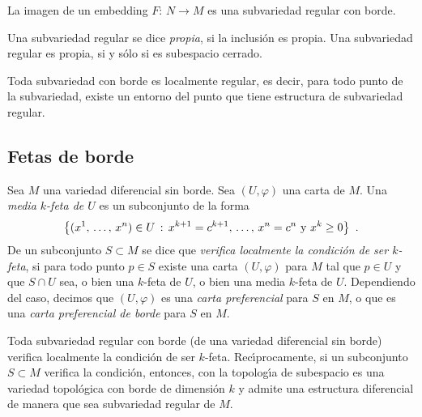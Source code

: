 La imagen de un embedding $F:\,N\rightarrow M$ es una subvariedad regular
con borde.

Una subvariedad regular se dice \emph{propia}, si la inclusi\'{o}n es propia.
Una subvariedad regular es propia, si y s\'{o}lo si es subespacio cerrado.

Toda subvariedad con borde es localmente regular, es decir, para todo
punto de la subvariedad, existe un entorno del punto que tiene estructura
de subvariedad regular.

\subsection{Fetas de borde}
Sea $M$ una variedad diferencial sin borde. Sea $(U,\varphi)$ una carta
de $M$. Una \emph{media $k$-feta de $U$} es un subconjunto de la forma
\begin{align*}
	\left\lbrace (\lista*{x}{n})\in U\,:\,
		x^{k+1}=c^{k+1},\,\dots,\,x^{n}=c^{n}\text{ y }
		x^{k}\geq 0\right\rbrace
	\text{ .}
\end{align*}
%
De un subconjunto $S\subset M$ se dice que \emph{verifica localmente la %
condici\'{o}n de ser $k$-feta}, si para todo punto $p\in S$ existe una
carta $(U,\varphi)$ para $M$ tal que $p\in U$ y que $S\cap U$ sea, o bien
una $k$-feta de $U$, o bien una media $k$-feta de $U$. Dependiendo del caso,
decimos que $(U,\varphi)$ es una \emph{carta preferencial} para $S$ en $M$,
o que es una \emph{carta preferencial de borde} para $S$ en $M$.

Toda subvariedad regular con borde (de una variedad diferencial sin borde)
verifica localmente la condici\'{o}n de ser $k$-feta. Rec\'{\i}procamente,
si un subconjunto $S\subset M$ verifica la condici\'{o}n, entonces, con
la topolog\'{\i}a de subespacio es una variedad topol\'{o}gica con borde
de dimensi\'{o}n $k$ y admite una estructura diferencial de manera que sea
subvariedad regular de $M$.
